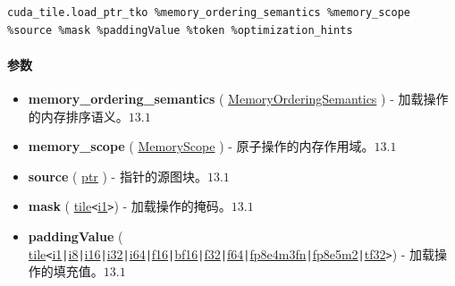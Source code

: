 \documentclass{article}
\begin{document}
\begin{lstlisting}
cuda_tile.load_ptr_tko %memory_ordering_semantics %memory_scope %source %mask %paddingValue %token %optimization_hints
\end{lstlisting}

\paragraph{参数}

\begin{itemize}
\item \textbf{memory\_ordering\_semantics} ( \href{https://docs.nvidia.com/cuda/tile-ir/latest/sections/operations.html#op-attribute-cuda-tile-load-ptr-tko-memoryorderingsemantics-attr}{MemoryOrderingSemantics} ) - 加载操作的内存排序语义。$\boxed{13.1}$
\item \textbf{memory\_scope} ( \href{https://docs.nvidia.com/cuda/tile-ir/latest/sections/operations.html#op-attribute-cuda-tile-load-ptr-tko-memoryscope-attr}{MemoryScope} ) - 原子操作的内存作用域。$\boxed{13.1}$
\item \textbf{source} ( \href{https://docs.nvidia.com/cuda/tile-ir/latest/sections/types.html#type-ptr}{ptr} ) - 指针的源图块。$\boxed{13.1}$
\item \textbf{mask} ( \href{https://docs.nvidia.com/cuda/tile-ir/latest/sections/types.html#type-tile}{tile}\texttt{<}\href{https://docs.nvidia.com/cuda/tile-ir/latest/sections/types.html#subsection-element-types}{i1}\texttt{>}) - 加载操作的掩码。$\boxed{13.1}$
\item \textbf{paddingValue} ( \href{https://docs.nvidia.com/cuda/tile-ir/latest/sections/types.html#type-tile}{tile}\texttt{<}\href{https://docs.nvidia.com/cuda/tile-ir/latest/sections/types.html#subsection-element-types}{i1}\texttt{|}\href{https://docs.nvidia.com/cuda/tile-ir/latest/sections/types.html#subsection-element-types}{i8}\texttt{|}\href{https://docs.nvidia.com/cuda/tile-ir/latest/sections/types.html#subsection-element-types}{i16}\texttt{|}\href{https://docs.nvidia.com/cuda/tile-ir/latest/sections/types.html#subsection-element-types}{i32}\texttt{|}\href{https://docs.nvidia.com/cuda/tile-ir/latest/sections/types.html#subsection-element-types}{i64}\texttt{|}\href{https://docs.nvidia.com/cuda/tile-ir/latest/sections/types.html#subsection-element-types}{f16}\texttt{|}\href{https://docs.nvidia.com/cuda/tile-ir/latest/sections/types.html#subsection-element-types}{bf16}\texttt{|}\href{https://docs.nvidia.com/cuda/tile-ir/latest/sections/types.html#subsection-element-types}{f32}\texttt{|}\href{https://docs.nvidia.com/cuda/tile-ir/latest/sections/types.html#subsection-element-types}{f64}\texttt{|}\href{https://docs.nvidia.com/cuda/tile-ir/latest/sections/types.html#subsection-element-types}{fp8e4m3fn}\texttt{|}\href{https://docs.nvidia.com/cuda/tile-ir/latest/sections/types.html#subsection-element-types}{fp8e5m2}\texttt{|}\href{https://docs.nvidia.com/cuda/tile-ir/latest/sections/types.html#subsection-element-types}{tf32}\texttt{>}) - 加载操作的填充值。$\boxed{13.1}$

\end{itemize}
\end{document}
